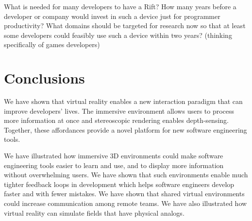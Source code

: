 \documentclass{acm_proc_article-sp}
\begin{document}
What is needed for many developers to have a Rift? How many years before a developer or company would invest in such a device just for programmer productivity? What domains should be targeted for research now so that at least some developers could feasibly use such a device within two years? (thinking specifically of games developers)

\section{Conclusions}
We have shown that virtual reality enables a new interaction paradigm that can improve developers' lives. The immersive environment allows users to process more information at once and stereoscopic rendering enables depth-sensing. Together, these affordances provide a novel platform for new software engineering tools.

We have illustrated how immersive 3D environments could make software engineering tools easier to learn and use, and to display more information without overwhelming users. We have shown that such environments enable much tighter feedback loops in development which helps software engineers develop faster and with fewer mistakes. We have shown that shared virtual environments could increase communication among remote teams. We have also illustrated how virtual reality can simulate fields that have physical analogs.



\end{document}
